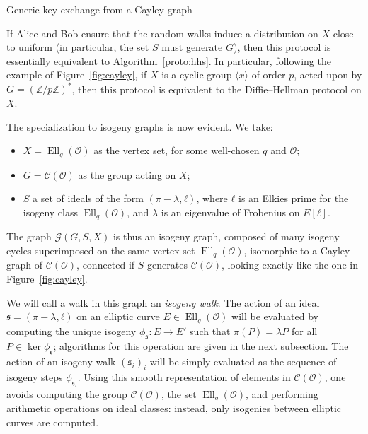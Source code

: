 \documentclass{article}
\newcommand{\Cl}{\mathcal{C}}
\newcommand{\Graph}{\mathcal{G}}
\renewcommand{\O}{\mathcal{O}}
\renewcommand{\frak}{\mathfrak}
\theoremstyle{definition}
\DeclareMathOperator{\Ell}{Ell}
\begin{document}
\begin{algorithm}
  \caption{Generic key exchange from a Cayley graph}
  \label{proto:cayley}
\end{algorithm}

If Alice and Bob ensure that the random walks induce a distribution on
$X$ close to uniform (in particular, the set $S$ must generate $G$),
then this protocol is essentially equivalent to
Algorithm~\ref{proto:hhs}. In particular, following the example of
Figure~\ref{fig:cayley}, if $X$ is a cyclic group $〈x〉$ of order
$p$, acted upon by $G=(ℤ/pℤ)^*$, then this protocol is equivalent to
the Diffie--Hellman protocol on $X$.

The specialization to isogeny graphs is now evident. We take:
\begin{itemize}
\item $X=\Ell_q(\O)$ as the vertex set, for some well-chosen $q$ and $\O$;
\item $G=\Cl(\O)$ as the group acting on $X$;
\item $S$ a set of ideals of the form $(π-λ,ℓ)$, where $ℓ$ is an
  Elkies prime for the isogeny class $\Ell_q(\O)$,
  and $λ$ is an eigenvalue of Frobenius on $E[ℓ]$. 
\end{itemize}
The graph $\Graph(G,S,X)$ is thus an isogeny graph, composed of many
isogeny cycles superimposed on the same vertex set $\Ell_q(\O)$,
isomorphic to a Cayley graph of $\Cl(\O)$, connected if $S$ generates
$\Cl(\O)$, looking exactly like the one in Figure~\ref{fig:cayley}.

We will call a walk in this graph an \emph{isogeny walk}. The action of
an ideal $\frak s=(π-λ,ℓ)$ on an elliptic curve $E∈\Ell_q(\O)$ will be
evaluated by computing the unique isogeny $ϕ_{\frak s}:E→E'$ such that
$π(P)=λP$ for all $P∈\ker ϕ_{\frak s}$; algorithms for this operation are given
in the next subsection. The action of an isogeny walk $(\frak s_i)_i$
will be simply evaluated as the sequence of isogeny steps
$ϕ_{\frak s_i}$. Using this smooth representation of elements
in $\Cl(\O)$, one avoids computing the group $\Cl(\O)$,
the set $\Ell_q(\O)$, and performing arithmetic operations on ideal classes:
instead, only isogenies between elliptic curves are computed.
\end{document}
